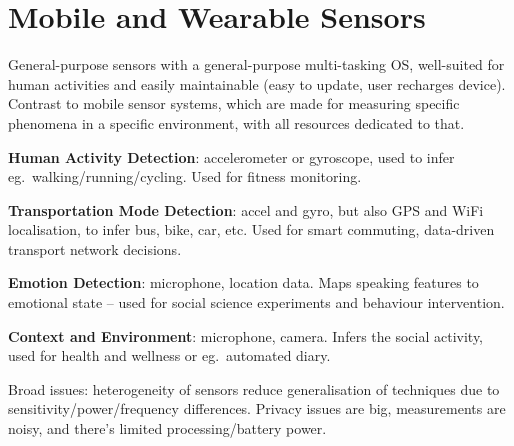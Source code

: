 \documentclass[a4paper, 11pt]{article}
\begin{document}
\section*{Mobile and Wearable Sensors}
{
    General-purpose sensors with a general-purpose multi-tasking OS, well-suited for human activities and easily maintainable (easy to update, user recharges device). Contrast to mobile sensor systems, which are made for measuring specific phenomena in a specific environment, with all resources dedicated to that.

    \textbf{Human Activity Detection}: accelerometer or gyroscope, used to infer eg.\ walking/running/cycling. Used for fitness monitoring.
    
    \textbf{Transportation Mode Detection}: accel and gyro, but also GPS and WiFi localisation, to infer bus, bike, car, etc. Used for smart commuting, data-driven transport network decisions.

    \textbf{Emotion Detection}: microphone, location data. Maps speaking features to emotional state -- used for social science experiments and behaviour intervention.

    \textbf{Context and Environment}: microphone, camera. Infers the social activity, used for health and wellness or eg.\ automated diary.

    Broad issues: heterogeneity of sensors reduce generalisation of techniques due to sensitivity/power/frequency differences. Privacy issues are big, measurements are noisy, and there's limited processing/battery power.
}
\end{document}
